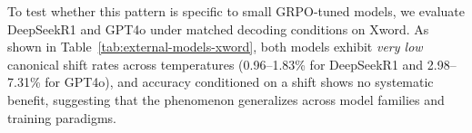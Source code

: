 To test whether this pattern is specific to small GRPO-tuned models, we evaluate DeepSeek\textendash R1 and GPT\textendash 4o under matched decoding conditions on Xword. As shown in Table~\ref{tab:external-models-xword}, both models exhibit \emph{very low} canonical shift rates across temperatures (0.96--1.83\% for DeepSeek\textendash R1 and 2.98--7.31\% for GPT\textendash 4o), and accuracy conditioned on a shift shows no systematic benefit, suggesting that the phenomenon generalizes across model families and training paradigms.
